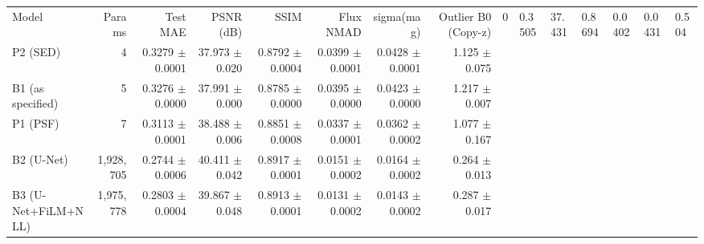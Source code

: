 \begin{tabular}{lrrrrrrr}
\hline
Model & Params & Test MAE & PSNR (dB) & SSIM & Flux NMAD & sigma(mag) & Outlier %
\hline
B0 (Copy-z) & 0 & 0.3505 & 37.431 & 0.8694 & 0.0402 & 0.0431 & 0.504 \\
P2 (SED) & 4 & 0.3279 $\pm$ 0.0001 & 37.973 $\pm$ 0.020 & 0.8792 $\pm$ 0.0004 & 0.0399 $\pm$ 0.0001 & 0.0428 $\pm$ 0.0001 & 1.125 $\pm$ 0.075 \\
B1 (as specified) & 5 & 0.3276 $\pm$ 0.0000 & 37.991 $\pm$ 0.000 & 0.8785 $\pm$ 0.0000 & 0.0395 $\pm$ 0.0000 & 0.0423 $\pm$ 0.0000 & 1.217 $\pm$ 0.007 \\
P1 (PSF) & 7 & 0.3113 $\pm$ 0.0001 & 38.488 $\pm$ 0.006 & 0.8851 $\pm$ 0.0008 & 0.0337 $\pm$ 0.0001 & 0.0362 $\pm$ 0.0002 & 1.077 $\pm$ 0.167 \\
B2 (U-Net) & 1,928,705 & 0.2744 $\pm$ 0.0006 & 40.411 $\pm$ 0.042 & 0.8917 $\pm$ 0.0001 & 0.0151 $\pm$ 0.0002 & 0.0164 $\pm$ 0.0002 & 0.264 $\pm$ 0.013 \\
B3 (U-Net+FiLM+NLL) & 1,975,778 & 0.2803 $\pm$ 0.0004 & 39.867 $\pm$ 0.048 & 0.8913 $\pm$ 0.0001 & 0.0131 $\pm$ 0.0002 & 0.0143 $\pm$ 0.0002 & 0.287 $\pm$ 0.017 \\
\hline
\end{tabular}
